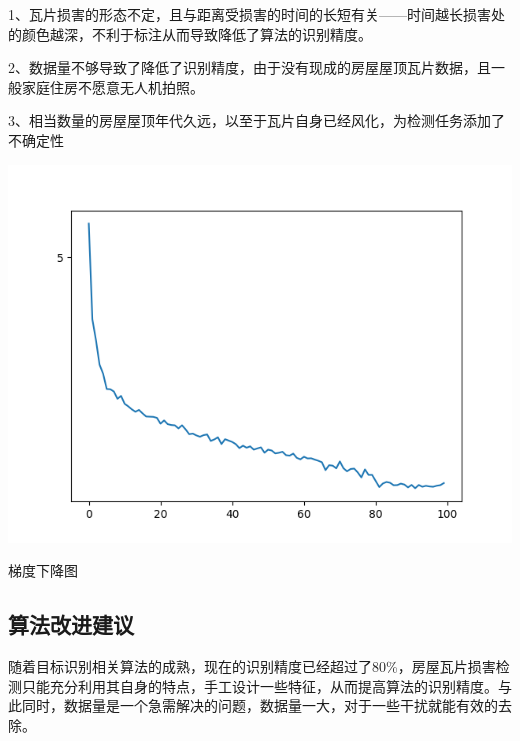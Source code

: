 1、瓦片损害的形态不定，且与距离受损害的时间的长短有关——时间越长损害处的颜色越深，不利于标注从而导致降低了算法的识别精度。

2、数据量不够导致了降低了识别精度，由于没有现成的房屋屋顶瓦片数据，且一般家庭住房不愿意无人机拍照。

3、相当数量的房屋屋顶年代久远，以至于瓦片自身已经风化，为检测任务添加了不确定性
\begin{uscfigure}
	\includegraphics[width=\textwidth]{./Pictures/loss.png}	
	\caption{梯度下降图}
	\label{result}
\end{uscfigure}
\subsection{算法改进建议}
随着目标识别相关算法的成熟，现在的识别精度已经超过了80\%，房屋瓦片损害检测只能充分利用其自身的特点，手工设计一些特征，从而提高算法的识别精度。与此同时，数据量是一个急需解决的问题，数据量一大，对于一些干扰就能有效的去除。
